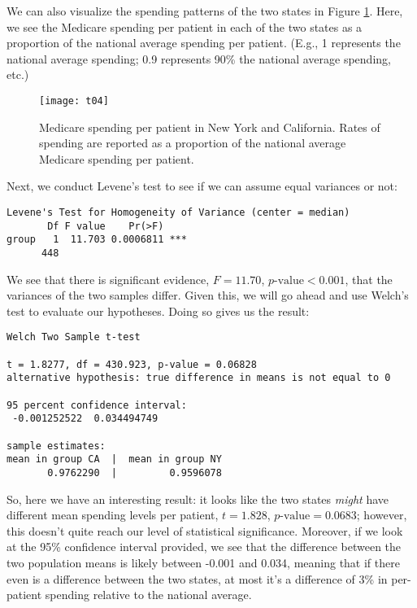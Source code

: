 We can also visualize the spending patterns of the two states in Figure \ref{fig:t03}. Here, we see the Medicare spending per patient in each of the two states as a proportion of the national average spending per patient. (E.g., 1 represents the national average spending; 0.9 represents 90\% the national average spending, etc.)

\begin{figure}[htp]
\texttt{[image: t04]}
\caption{Medicare spending per patient in New York and California. Rates of spending are reported as a proportion of the national average Medicare spending per patient.}
\label{fig:t03}
\end{figure}

Next, we conduct Levene's test to see if we can assume equal variances or not:
\begin{framed}
\begin{Verbatim}[samepage=TRUE]
Levene's Test for Homogeneity of Variance (center = median)
       Df F value    Pr(>F)    
group   1  11.703 0.0006811 ***
      448  
\end{Verbatim}
\end{framed}

We see that there is significant evidence, $F=11.70$, $p\text{-value}<0.001$, that the variances of the two samples differ. Given this, we will go ahead and use Welch's test to evaluate our hypotheses. Doing so gives us the result:
\begin{framed}
\begin{Verbatim}[samepage=TRUE]
	Welch Two Sample t-test

t = 1.8277, df = 430.923, p-value = 0.06828
alternative hypothesis: true difference in means is not equal to 0

95 percent confidence interval:
 -0.001252522  0.034494749

sample estimates:
mean in group CA  |  mean in group NY 
       0.9762290  |         0.9596078 
\end{Verbatim}
\end{framed}

So, here we have an interesting result: it looks like the two states \textit{might} have different mean spending levels per patient, $t=1.828$, $p\text{-value}=0.0683$; however, this doesn't quite reach our level of statistical significance. Moreover, if we look at the 95\% confidence interval provided, we see that the difference between the two population means is likely between -0.001 and 0.034, meaning that if there even is a difference between the two states, at most it's a difference of 3\% in per-patient spending relative to the national average.

